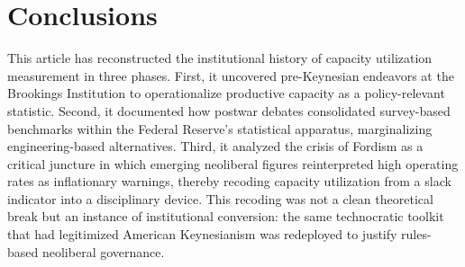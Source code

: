 \documentclass[11pt]{article}
\begin{document}
\section{Conclusions}

This article has reconstructed the institutional history of capacity utilization measurement in three phases. First, it uncovered pre-Keynesian endeavors at the Brookings Institution to operationalize productive capacity as a policy-relevant statistic. Second, it documented how postwar debates consolidated survey-based benchmarks within the Federal Reserve's statistical apparatus, marginalizing engineering-based alternatives. Third, it analyzed the crisis of Fordism as a critical juncture in which emerging neoliberal figures reinterpreted high operating rates as inflationary warnings, thereby recoding capacity utilization from a slack indicator into a disciplinary device. This recoding was not a clean theoretical break but an instance of institutional conversion: the same technocratic toolkit that had legitimized American Keynesianism was redeployed to justify rules-based neoliberal governance.
\end{document}
